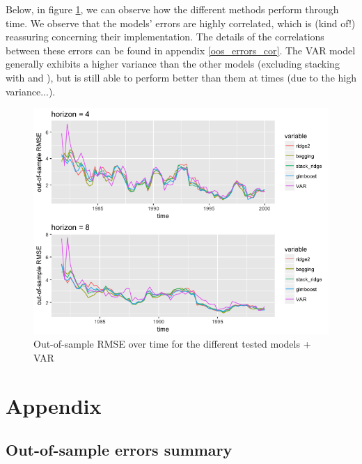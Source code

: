 \begin{verbatim}

\end{verbatim}


Below, in figure \ref{oos_rmse_over_time}, we can observe how the different methods perform through time. We observe that the models' errors are highly correlated, which is (kind of!) reassuring concerning their implementation. The details of the correlations between these errors can be found in appendix \ref{oos_errors_cor}. The VAR model generally exhibits a higher variance than the other models (excluding stacking with  and ), but is still able to perform better than them at times (due to the high variance...).    

\begin{figure}[!htb]
\centering
\includegraphics[width=14cm]{gfx/chapter-rvfl-ensembles/oos_rmse_over_time.png}
\caption{Out-of-sample RMSE over time for the different tested models + VAR}
\label{oos_rmse_over_time}
\end{figure}

\newpage

\section{Appendix}

\subsection{Out-of-sample errors summary}
\label{boxplot_summary}

